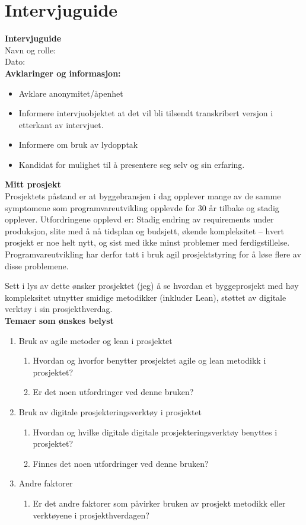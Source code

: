 \section{Intervjuguide}
\noindent\textbf{Intervjuguide} \\
Navn og rolle: \\
Dato: \\

\noindent\textbf{Avklaringer og informasjon:} 
\begin{itemize}
    \item Avklare anonymitet/åpenhet
    \item Informere intervjuobjektet at det vil bli tilsendt transkribert versjon i etterkant av intervjuet.
    \item Informere om bruk av lydopptak
    \item Kandidat for mulighet til å presentere seg selv og sin erfaring.
\end{itemize}

\noindent\textbf{Mitt prosjekt} \\
Prosjektets påstand er at byggebransjen i dag opplever mange av de samme symptomene som programvareutvikling opplevde for 30 år tilbake og stadig opplever. Utfordringene opplevd er: Stadig endring av requirements under produksjon, slite med å nå tidsplan og budsjett, økende kompleksitet – hvert prosjekt er noe helt nytt, og sist med ikke minst problemer med ferdigstillelse. Programvareutvikling har derfor tatt i bruk agil prosjektstyring for å løse flere av disse problemene.

Sett i lys av dette ønsker prosjektet (jeg) å se hvordan et byggeprosjekt med høy kompleksitet utnytter smidige metodikker (inkluder Lean), støttet av digitale verktøy i sin prosjekthverdag. \\

\noindent\textbf{Temaer som ønskes belyst}
\begin{enumerate}
    \item Bruk av agile metoder og lean i prosjektet
    \begin{enumerate}
        \item Hvordan og hvorfor benytter prosjektet agile og lean metodikk i prosjektet?
        \item Er det noen utfordringer ved denne bruken?
    \end{enumerate}
    \item Bruk av digitale prosjekteringsverktøy i prosjektet
    \begin{enumerate}
        \item Hvordan og hvilke digitale digitale prosjekteringsverktøy benyttes i\\ prosjektet?
        \item Finnes det noen utfordringer ved denne bruken?
    \end{enumerate}
    \item Andre faktorer
    \begin{enumerate}
        \item Er det andre faktorer som påvirker bruken av prosjekt metodikk eller\\ verktøyene i prosjekthverdagen?
    \end{enumerate}
\end{enumerate}